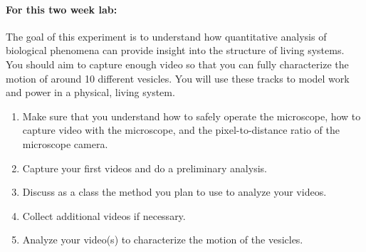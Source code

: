 \paragraph{For this two week lab:} The goal of this experiment is to understand how quantitative analysis of biological phenomena can provide insight into the structure of living systems. You should aim to capture enough video so that you can fully characterize the motion of around 10 different vesicles. You will use these tracks to model work and power in a physical, living system.
\begin{enumerate}
\item Make sure that you understand how to safely operate the microscope, how to capture video with the microscope, and the pixel-to-distance ratio of the microscope camera.
\item Capture your first videos and do a preliminary analysis.
\item Discuss as a class the method you plan to use to analyze your videos.
\item Collect additional videos if necessary.
\item Analyze your video(s) to characterize the motion of the vesicles.
\end{enumerate}


